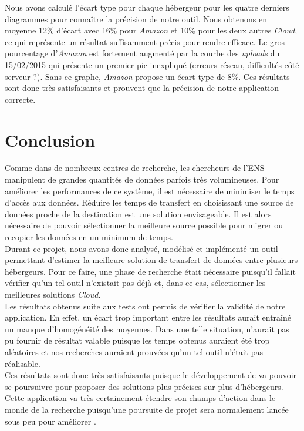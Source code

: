 \documentclass[10pt]{article}
\begin{document}
Nous avons calculé l'écart type pour chaque hébergeur pour les quatre derniers diagrammes pour connaître la précision de notre outil. Nous obtenons en moyenne 12\% d'écart avec 16\% pour \textit{Amazon} et 10\% pour les deux autres \textit{Cloud}, ce qui représente un résultat suffisamment précis pour rendre \KYD efficace. Le gros pourcentage d'\textit{Amazon} est fortement augmenté par la courbe des \textit{uploads} du 15/02/2015 qui présente un premier pic inexpliqué (erreurs réseau, difficultés côté serveur ?). Sans ce graphe, \textit{Amazon} propose un écart type de 8\%. Ces résultats sont donc très satisfaisants et prouvent que la précision de notre application correcte.

\section{Conclusion}


Comme dans de nombreux centres de recherche, les chercheurs de l'ENS manipulent de grandes quantités de données parfois très volumineuses. Pour améliorer les performances de ce système, il est nécessaire de minimiser le temps d'accès aux données. Réduire les temps de transfert en choisissant une source de données proche de la destination est une solution envisageable. Il est alors nécessaire de pouvoir sélectionner la meilleure source possible pour migrer ou recopier les données en un minimum de temps.\\

Durant ce projet, nous avons donc analysé, modélisé et implémenté un outil
permettant d'estimer la meilleure solution de transfert de données entre
plusieurs hébergeurs. Pour ce faire, une phase de recherche était nécessaire
puisqu'il fallait vérifier qu'un tel outil n'existait pas déjà et, dans ce cas,
sélectionner les meilleures solutions \textit{Cloud}.\\

Les résultats obtenus suite aux tests ont permis de vérifier la validité de
notre application. En effet, un écart trop important entre les résultats aurait
entraîné un manque d'homogénéité des moyennes. Dans une telle situation,
\KYD n'aurait pas pu fournir de résultat valable puisque les temps 
obtenus auraient été trop aléatoires et nos recherches auraient prouvées qu'un 
tel outil n'était pas réalisable.\\


Ces résultats sont donc très satisfaisants puisque le développement de
\KYD va pouvoir se poursuivre pour proposer des solutions plus précises
sur plus d'hébergeurs. Cette application va très certainement étendre son
champs d'action dans le monde de la recherche puisqu'une poursuite de projet
sera normalement lancée sous peu pour améliorer \KYD.\\
\end{document}
